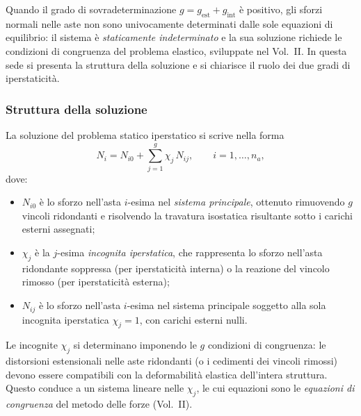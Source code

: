 Quando il grado di sovradeterminazione $g = g_\text{est}
+ g_\text{int}$ è positivo, gli sforzi normali nelle
aste non sono univocamente determinati dalle sole
equazioni di equilibrio: il sistema è
\emph{staticamente indeterminato} e la sua soluzione
richiede le condizioni di congruenza del problema
elastico, sviluppate nel Vol.~II. In questa sede
si presenta la struttura della soluzione e si
chiarisce il ruolo dei due gradi di iperstaticità.

\subsubsection{Struttura della soluzione}
\label{subsec:iperstat_struttura}

La soluzione del problema statico iperstatico si
scrive nella forma
\begin{equation}\label{eq:sol_iperstatica}
	N_i = N_{i0} + \sum_{j=1}^{g} \chi_j\, N_{ij},
	\qquad i = 1, \ldots, n_a,
\end{equation}
dove:
\begin{itemize}[noitemsep]
	\item $N_{i0}$ è lo sforzo nell'asta $i$-esima
	nel \emph{sistema principale}, ottenuto
	rimuovendo $g$ vincoli ridondanti e
	risolvendo la travatura isostatica risultante
	sotto i carichi esterni assegnati;
	\item $\chi_j$ è la $j$-esima \emph{incognita
		iperstatica}, che rappresenta lo sforzo
	nell'asta ridondante soppressa (per
	iperstaticità interna) o la reazione del
	vincolo rimosso (per iperstaticità esterna);
	\item $N_{ij}$ è lo sforzo nell'asta $i$-esima
	nel sistema principale soggetto alla sola
	incognita iperstatica $\chi_j = 1$, con
	carichi esterni nulli.
\end{itemize}

Le incognite $\chi_j$ si determinano imponendo
le $g$ condizioni di congruenza: le distorsioni
estensionali nelle aste ridondanti (o i cedimenti
dei vincoli rimossi) devono essere compatibili con
la deformabilità elastica dell'intera struttura.
Questo conduce a un sistema lineare nelle $\chi_j$,
le cui equazioni sono le \emph{equazioni di
	congruenza} del metodo delle forze (Vol.~II).

